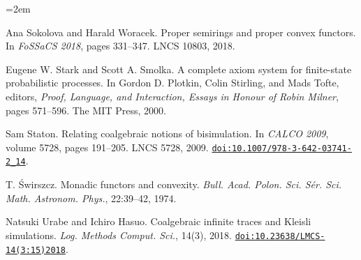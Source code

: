 \documentclass[11pt,a4paper]{amsart}
\begin{document}
\begin{list}{}{\leftmargin=2em}
\hypertarget{html:bib.bib28}{}
\item[]  [28]  Ana Sokolova and Harald Woracek.  Proper semirings and proper convex functors.  In \emph{FoSSaCS 2018}, pages 331–347. LNCS 10803, 2018.  
\hypertarget{html:bib.bib29}{}
\item[]  [29]  Eugene W. Stark and Scott A. Smolka.  A complete axiom system for finite-state probabilistic processes.  In Gordon D. Plotkin, Colin Stirling, and Mads Tofte, editors, \emph{Proof, Language, and Interaction, Essays in Honour of Robin Milner}, pages 571–596. The MIT Press, 2000.  
\hypertarget{html:bib.bib30}{}
\item[]  [30]  Sam Staton.  Relating coalgebraic notions of bisimulation.  In \emph{CALCO 2009}, volume 5728, pages 191–205. LNCS 5728, 2009.  \href{https://doi.org/10.1007/978-3-642-03741-2_14}{\nolinkurl{doi:10.1007/978-3-642-03741-2_14}}.  
\hypertarget{html:bib.bib31}{}
\item[]  [31]  T. Świrszcz.  Monadic functors and convexity.  \emph{Bull. Acad. Polon. Sci. Sér. Sci. Math. Astronom. Phys.}, 22:39–42, 1974.  
\hypertarget{html:bib.bib32}{}
\item[]  [32]  Natsuki Urabe and Ichiro Hasuo.  Coalgebraic infinite traces and Kleisli simulations.  \emph{Log. Methods Comput. Sci.}, 14(3), 2018.  \href{https://doi.org/10.23638/LMCS-14(3:15)2018}{\nolinkurl{doi:10.23638/LMCS-14(3:15)2018}}.  
 
\end{list}
 
\end{document}
